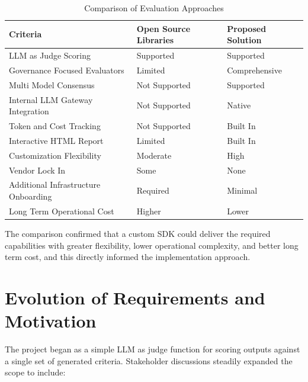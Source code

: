 \documentclass[12pt, a4paper, oneside]{report}
\begin{document}
\begin{table}[h]
\centering
\caption{Comparison of Evaluation Approaches}
\label{tab:evaluation-comparison}
\begin{tabular}{|p{6cm}|p{5cm}|p{5cm}|}
\hline
\textbf{Criteria} & \textbf{Open Source Libraries} & \textbf{Proposed Solution} \\
\hline

LLM as Judge Scoring &
Supported &
Supported
\\
\hline

Governance Focused Evaluators &
Limited &
Comprehensive
\\
\hline

Multi Model Consensus &
Not Supported &
Supported
\\
\hline

Internal LLM Gateway Integration &
Not Supported &
Native
\\
\hline

Token and Cost Tracking &
Not Supported &
Built In
\\
\hline

Interactive HTML Report &
Limited &
Built In
\\
\hline

Customization Flexibility &
Moderate &
High
\\
\hline

Vendor Lock In &
Some &
None
\\
\hline

Additional Infrastructure Onboarding &
Required &
Minimal
\\
\hline

Long Term Operational Cost &
Higher &
Lower
\\
\hline

\end{tabular}
\end{table}

The comparison confirmed that a custom SDK could deliver the required capabilities with greater flexibility, lower operational complexity, and better long term cost, and this directly informed the implementation approach.

\section{Evolution of Requirements and Motivation}

The project began as a simple LLM as judge function for scoring outputs against a single set of generated criteria. Stakeholder discussions steadily expanded the scope to include:
\end{document}
